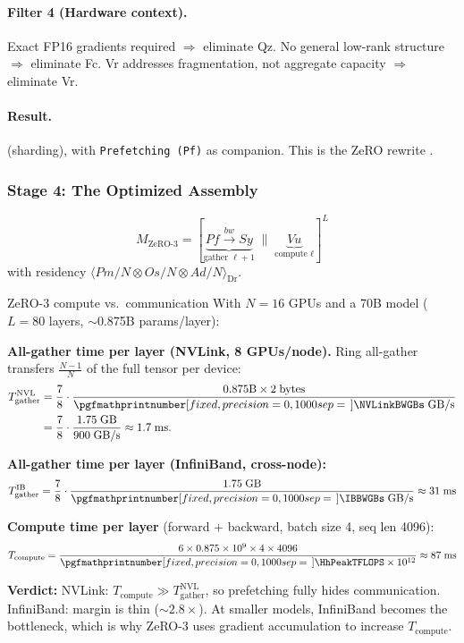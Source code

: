 \documentclass[10pt,twocolumn]{article}
\newcommand{\cvalint}[1]{\pgfmathprintnumber[fixed, precision=0, 1000 sep={\,}]{#1}}
\begin{document}
\paragraph{Filter 4 (Hardware context).} Exact FP16 gradients required $\Rightarrow$ eliminate Qz. No general low-rank structure $\Rightarrow$ eliminate Fc. Vr addresses fragmentation, not aggregate capacity $\Rightarrow$ eliminate Vr.

\paragraph{Result.}  (sharding), with \texttt{Prefetching (Pf)} as companion. This is the ZeRO rewrite \citep{rajbhandari2020}.

\subsubsection{Stage 4: The Optimized Assembly}

\begin{equation*}
M_{\text{ZeRO-3}} = \left[\underbrace{Pf \xrightarrow{bw} Sy}_{\text{gather } \ell{+}1} \;\parallel\; \underbrace{Vu}_{\text{compute } \ell}\right]^{L}
\end{equation*}
with residency $\langle Pm/N \otimes Os/N \otimes Ad/N \rangle_{\text{Dr}}$.

\begin{napkinmath}{ZeRO-3 compute vs.\ communication}
With $N = 16$ GPUs and a 70B model ($L = 80$ layers, ${\sim}$0.875B params/layer):

\textbf{All-gather time per layer (NVLink, 8 GPUs/node).} Ring all-gather transfers $\frac{N-1}{N}$ of the full tensor per device:
\begin{align*}
T_{\text{gather}}^{\text{NVL}}
&= \frac{7}{8} \cdot
   \frac{0.875\text{B} \times 2\;\text{bytes}}
        {\cvalint{\NVLinkBWGBs}\;\text{GB/s}} \\
&= \frac{7}{8} \cdot \frac{1.75\;\text{GB}}{900\;\text{GB/s}}
 \approx 1.7\;\text{ms}.
\end{align*}

\textbf{All-gather time per layer (InfiniBand, cross-node):}
\[
T_{\text{gather}}^{\text{IB}} = \frac{7}{8} \cdot \frac{1.75\;\text{GB}}{\cvalint{\IBBWGBs}\;\text{GB/s}} \approx 31\;\text{ms}
\]

\textbf{Compute time per layer} (forward + backward, batch size 4, seq len 4096):
\[
T_{\text{compute}} = \frac{6 \times 0.875 \times 10^9 \times 4 \times 4096}{\cvalint{\HhPeakTFLOPS} \times 10^{12}} \approx 87\;\text{ms}
\]

\textbf{Verdict:} NVLink: $T_{\text{compute}} \gg T_{\text{gather}}^{\text{NVL}}$, so prefetching fully hides communication. InfiniBand: margin is thin ($\sim$$2.8\times$). At smaller models, InfiniBand becomes the bottleneck, which is why ZeRO-3 uses gradient accumulation to increase $T_{\text{compute}}$.
\end{napkinmath}
\end{document}
